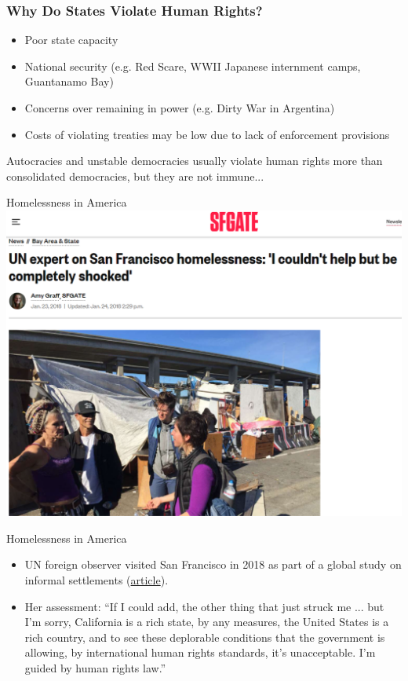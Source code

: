 \documentclass[handout]{beamer}
\begin{document}
\begin{frame} 
	\frametitle{\LARGE{Why Do States Violate Human Rights?}}
	\begin{itemize}
		\item Poor state capacity \pause
		
		\item National security (e.g. Red Scare, WWII Japanese internment camps, Guantanamo Bay) \pause
		
		\item Concerns over remaining in power (e.g. Dirty War in Argentina)\pause 
		
		\item Costs of violating treaties may be low due to lack of enforcement provisions \pause 
	\end{itemize}
	Autocracies and unstable democracies usually violate human rights more than consolidated democracies, but they are not immune...
\end{frame}

\begin{frame}{\LARGE Homelessness in America}
	\centering
	\includegraphics[width=\textwidth,height=0.9\textheight,keepaspectratio]{SFhomeless.png}
\end{frame}

\begin{frame}{\LARGE Homelessness in America}
	\begin{itemize}
		\item UN foreign observer visited San Francisco in 2018 as part of a global study on informal settlements (\href{https://www.sfgate.com/bayarea/article/Leilani-Farah-UN-rapporteur-homelessness-SF-CA-12519117.php}{article}). \pause
		\item Her assessment: ``If I could add, the other thing that just struck me ... but I'm sorry, California is a rich state, by any measures, the United States is a rich country, and to see these deplorable conditions that the government is allowing, by international human rights standards, it's unacceptable. I'm guided by human rights law.”
		
	\end{itemize}
\end{frame}
\end{document}
